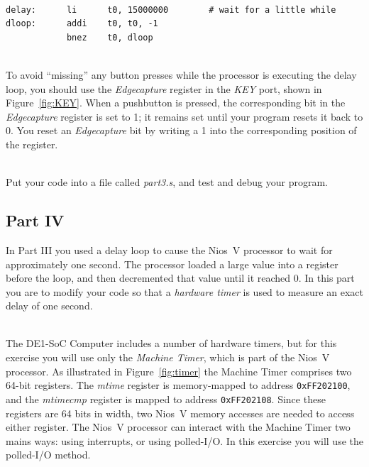 \documentclass[epsfig,10pt,fullpage]{article}
\begin{document}
~\\
\noindent
\begin{lstlisting}[style=defaultNiosVStyle]
delay:      li      t0, 15000000        # wait for a little while
dloop:      addi    t0, t0, -1
            bnez    t0, dloop
\end{lstlisting}

~\\
\noindent
To avoid ``missing'' any button presses while the processor is executing the delay loop, you
should use the {\it Edgecapture} register in the {\it KEY} port, shown in Figure~\ref{fig:KEY}.
When a pushbutton is pressed, the corresponding bit in the {\it Edgecapture} register is
set to 1; it remains set until your program resets it back to 0. You reset an {\it
Edgecapture} bit by writing a 1 into the corresponding position of the register.

~\\
\noindent
Put your code into a file called {\it part3.s}, and test and debug your program.

\subsection*{Part IV}

\noindent
In Part III you used a delay loop to cause the Nios~V processor to wait for approximately one
second. The processor loaded a large value into a register before the loop, and then 
decremented that value until it reached 0.  In this part you are to modify your code so that a
{\it hardware timer} is used to measure an exact delay of one second. 

~\\
\noindent
The DE1-SoC Computer includes a number of hardware timers, but for this exercise you will
use only the {\it Machine Timer}, which is part of the Nios~V processor. As illustrated
in Figure~\ref{fig:timer} the Machine Timer comprises two 64-bit registers. 
The {\it mtime} register is memory-mapped to address \texttt{0xFF202100}, and the 
{\it mtimecmp} register is mapped to address \texttt{0xFF202108}. Since these registers are
64 bits in width, two Nios~V memory accesses are needed to access either register. The
Nios~V processor can interact with the Machine Timer two mains ways: using interrupts, or
using polled-I/O. In this exercise you will use the polled-I/O method.
\end{document}
